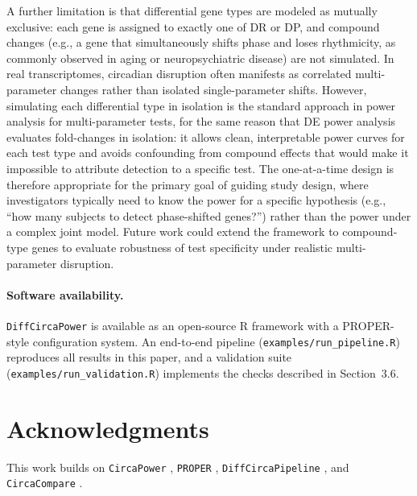 \documentclass{article}
\newcommand{\software}[1]{\texttt{#1}}
\begin{document}
A further limitation is that differential gene types are modeled as mutually exclusive: each gene is assigned to exactly one of DR or DP, and compound changes (e.g., a gene that simultaneously shifts phase and loses rhythmicity, as commonly observed in aging or neuropsychiatric disease) are not simulated. In real transcriptomes, circadian disruption often manifests as correlated multi-parameter changes rather than isolated single-parameter shifts. However, simulating each differential type in isolation is the standard approach in power analysis for multi-parameter tests, for the same reason that DE power analysis evaluates fold-changes in isolation: it allows clean, interpretable power curves for each test type and avoids confounding from compound effects that would make it impossible to attribute detection to a specific test. The one-at-a-time design is therefore appropriate for the primary goal of guiding study design, where investigators typically need to know the power for a specific hypothesis (e.g., ``how many subjects to detect phase-shifted genes?'') rather than the power under a complex joint model. Future work could extend the framework to compound-type genes to evaluate robustness of test specificity under realistic multi-parameter disruption.

\paragraph{Software availability.} \software{DiffCircaPower} is available as an open-source R framework with a PROPER-style configuration system. An end-to-end pipeline (\texttt{examples/run\_pipeline.R}) reproduces all results in this paper, and a validation suite (\texttt{examples/run\_validation.R}) implements the checks described in Section~3.6.

\section*{Acknowledgments}

This work builds on \software{CircaPower} \cite{zong2023circapower}, \software{PROPER} \cite{wu2015proper}, \software{DiffCircaPipeline} \cite{xue2023diffcircapipeline}, and \software{CircaCompare} \cite{parsons2020circacompare}.



\end{document}
